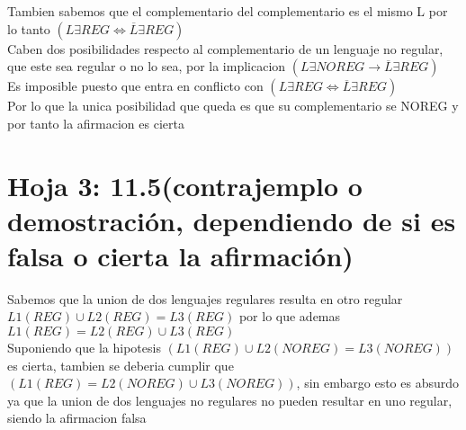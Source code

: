 \documentclass[11pt]{article}
\begin{document}
Tambien sabemos que el complementario del complementario es el mismo L por lo tanto $(L \exists REG \Longleftrightarrow{} \overline{L} \exists REG)$\\

Caben dos posibilidades respecto al complementario de un lenguaje no regular, que este sea regular o no lo sea, por la implicacion $(L \exists NOREG \xrightarrow{} \overline{L} \exists REG)$\\ 

Es imposible puesto que entra en conflicto con $(L \exists REG \Longleftrightarrow{} \overline{L} \exists REG)$\\
Por lo que la unica posibilidad que queda es que su complementario se NOREG y por tanto la afirmacion es cierta
\section{Hoja 3: 11.5(contrajemplo o demostración, dependiendo de si es falsa o cierta la afirmación)}

Sabemos que la union de dos lenguajes regulares resulta en otro regular $L1(REG) \cup L2(REG) = L3(REG)$ por lo que ademas $L1(REG) = L2(REG) \cup L3(REG)$\\
Suponiendo que la hipotesis $(L1(REG) \cup L2(NOREG) = L3(NOREG))$ es cierta, tambien se deberia cumplir que $(L1(REG) = L2(NOREG) \cup L3(NOREG))$, sin embargo esto es absurdo ya que la union de dos lenguajes no regulares no pueden resultar en uno regular, siendo la afirmacion falsa
\end{document}
